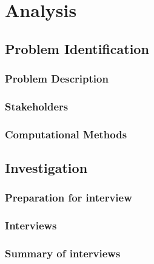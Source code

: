 \documentclass[11pt,a4paper]{article}
\title{\projectname}
\author{James Cahill}
\date{Sepetember 2023}
\begin{document}



\tableofcontents

\pagebreak

\section{Analysis}

\subsection{Problem Identification}

\subsubsection{Problem Description}


\subsubsection{Stakeholders}


\subsubsection{Computational Methods}


\subsection{Investigation}

\subsubsection{Preparation for interview}


\subsubsection{Interviews}


\begin{comment}
2 or 3

person
question
answer
brief summary
\end{comment}

\subsubsection{Summary of interviews}

\end{document}
